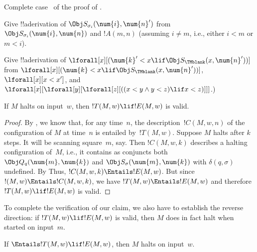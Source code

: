 \documentclass[../../../include/open-logic-section]{subfiles}
\begin{document}
\begin{prob}
Complete case~ of the proof of
.
\end{prob}

\begin{prob}
Give !!a{derivation} of $\Obj S_{\sigma_i}(\num{i}, \num{n}')$ from
$\Obj S_{\sigma_i}(\num{i}, \num{n})$ and $!A(m, n)$ (assuming $i \neq
m$, i.e., either $i < m$ or $m < i$).
\end{prob}

\begin{prob}
Give !!a{derivation} of $\lforall[x][(\num{k}' < x \lif \Obj
  S_\TMblank(x, \num{n}'))]$ from $\lforall[x][(\num{k} < x \lif \Obj
  S_\TMblank(x, \num{n}'))]$, $\lforall[x][x < x']$, and
$\lforall[x][\lforall[y][\lforall[z][ ((x < y \land y < z) \lif x <
      z)]]]$.)
\end{prob}


\begin{lem}
If $M$ halts on input~$w$, then $!T(M, w) \lif
!E(M, w)$ is valid.
\end{lem}

\begin{proof}
By , we know that, for any time~$n$, the
description~$!C(M, w, n)$ of the configuration of $M$ at time~$n$ is
entailed by~$!T(M, w)$.  Suppose $M$ halts after $k$ steps. It will be
scanning square~$m$, say. Then $!C(M, w, k)$ describes a halting
configuration of~$M$, i.e., it contains as conjuncts both $\Obj
Q_q(\num{m}, \num{k})$ and $\Obj S_\sigma(\num{m}, \num{k})$ with
$\delta(q,\sigma)$ undefined.  By 
Thus, $!C(M, w, k) \Entails !E(M, w)$. But since $!(M, w) \Entails
!C(M, w, k)$, we have $!T(M, w) \Entails !E(M, w)$ and therefore
$!T(M, w) \lif !E(M, w)$ is valid.
\end{proof}


\begin{explain} 
To complete the verification of our claim, we also have to
establish the reverse direction: if $!T(M, w) \lif !E(M, w)$ is valid, then
$M$ does in fact halt when started on input~$m$. 
\end{explain}

\begin{lem}
If $\Entails !T(M, w) \lif !E(M, w)$, then $M$ halts on input~$w$.
\end{lem}
\end{document}
